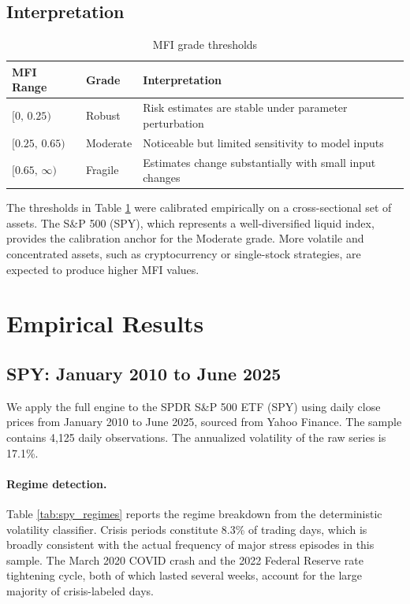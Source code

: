 \documentclass[12pt]{article}
\begin{document}
\subsection{Interpretation}

\begin{table}[h]
\centering
\caption{MFI grade thresholds}
\label{tab:mfi_grades}
\begin{tabular}{lll}
\toprule
MFI Range & Grade & Interpretation \\
\midrule
$[0,\, 0.25)$  & Robust   & Risk estimates are stable under parameter perturbation \\
$[0.25,\, 0.65)$ & Moderate & Noticeable but limited sensitivity to model inputs \\
$[0.65,\, \infty)$ & Fragile  & Estimates change substantially with small input changes \\
\bottomrule
\end{tabular}
\end{table}

The thresholds in Table \ref{tab:mfi_grades} were calibrated empirically on a
cross-sectional set of assets. The S\&P 500 (SPY), which represents a well-diversified
liquid index, provides the calibration anchor for the Moderate grade. More volatile
and concentrated assets, such as cryptocurrency or single-stock strategies, are
expected to produce higher MFI values.


\section{Empirical Results}

\subsection{SPY: January 2010 to June 2025}

We apply the full engine to the SPDR S\&P 500 ETF (SPY) using daily close prices
from January 2010 to June 2025, sourced from Yahoo Finance. The sample contains
4,125 daily observations. The annualized volatility of the raw series is 17.1\%.

\paragraph{Regime detection.}

Table \ref{tab:spy_regimes} reports the regime breakdown from the deterministic
volatility classifier. Crisis periods constitute 8.3\% of trading days, which is
broadly consistent with the actual frequency of major stress episodes in this sample.
The March 2020 COVID crash and the 2022 Federal Reserve rate tightening cycle, both
of which lasted several weeks, account for the large majority of crisis-labeled days.
\end{document}

